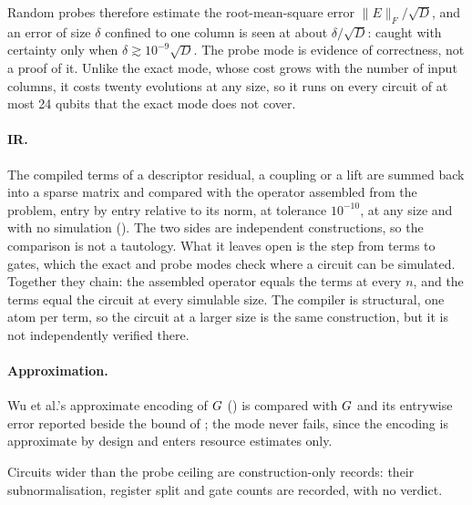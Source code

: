Random probes therefore estimate the root-mean-square error $\|E\|_F/\sqrt D$, and an error of size $\delta$ confined to one column is seen at about $\delta/\sqrt D$: caught with certainty only when $\delta\gtrsim10^{-9}\sqrt D$. The probe mode is evidence of correctness, not a proof of it. Unlike the exact mode, whose cost grows with the number of input columns, it costs twenty evolutions at any size, so it runs on every circuit of at most 24 qubits that the exact mode does not cover.

\paragraph{IR.} The compiled terms of a descriptor residual, a coupling or a lift are summed back into a sparse matrix and compared with the operator assembled from the problem, entry by entry relative to its norm, at tolerance $10^{-10}$, at any size and with no simulation (). The two sides are independent constructions, so the comparison is not a tautology. What it leaves open is the step from terms to gates, which the exact and probe modes check where a circuit can be simulated. Together they chain: the assembled operator equals the terms at every $n$, and the terms equal the circuit at every simulable size. The compiler is structural, one atom per term, so the circuit at a larger size is the same construction, but it is not independently verified there.

\paragraph{Approximation.} Wu et al.'s approximate encoding of $G$ () is compared with $G$ and its entrywise error reported beside the bound of ; the mode never fails, since the encoding is approximate by design and enters resource estimates only.

Circuits wider than the probe ceiling are construction-only records: their subnormalisation, register split and gate counts are recorded, with no verdict.

